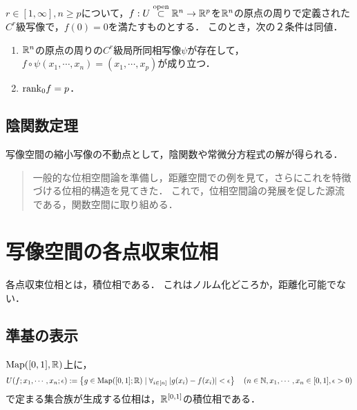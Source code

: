 \documentclass[uplatex,dvipdfmx]{jsreport}
\begin{document}
\begin{corollary}[低次元への写像の場合]\label{cor-implicit-function-2}
    $r\in[1,\infty],n\ge p$について，$f:U\overset{\mathrm{open}}{\subset}\mathbb{R}^n\to\mathbb{R}^p$を$\mathbb{R}^n$の原点の周りで定義された$C^r$級写像で，$f(0)=0$を満たすものとする．
    このとき，次の２条件は同値．
    \begin{enumerate}
        \item $\mathbb{R}^n$の原点の周りの$C^r$級局所同相写像$\psi$が存在して，$f\circ\psi(x_1,\cdots,x_n)=(x_1,\cdots,x_p)$が成り立つ．
        \item $\mathrm{rank}_0f=p$．
    \end{enumerate}
\end{corollary}


\subsection{陰関数定理}

\begin{tcolorbox}[colframe=ForestGreen, colback=ForestGreen!10!white,breakable,colbacktitle=ForestGreen!40!white,coltitle=black,fonttitle=\bfseries\sffamily,
title=]
    写像空間の縮小写像の不動点として，陰関数や常微分方程式の解が得られる．
\end{tcolorbox}

\begin{quotation}
    一般的な位相空間論を準備し，距離空間での例を見て，さらにこれを特徴づける位相的構造を見てきた．
    これで，位相空間論の発展を促した源流である，関数空間に取り組める．
\end{quotation}

\section{写像空間の各点収束位相}

\begin{tcolorbox}[colframe=ForestGreen, colback=ForestGreen!10!white,breakable,colbacktitle=ForestGreen!40!white,coltitle=black,fonttitle=\bfseries\sffamily,
title=]
    各点収束位相とは，積位相である．
    これはノルム化どころか，距離化可能でない．
\end{tcolorbox}

\subsection{準基の表示}

\begin{proposition}
    $\mathrm{Map}([0,1],\mathbb{R})$上に，
    \[U(f;x_1,\cdots,x_n;\epsilon):=\left\{g\in\mathrm{Map}([0,1];\mathbb{R})\mid\forall_{i\in[n]}\;\lvert g(x_i)-f(x_i)\rvert<\epsilon\right\}\quad(n\in\mathbb{N},x_1,\cdots,x_n\in[0,1],\epsilon>0)\]
    で定まる集合族が生成する位相は，$\mathbb{R}^{[0,1]}$の積位相である．
\end{proposition}
\end{document}

